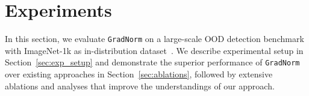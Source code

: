 \documentclass{article}
\begin{document}


\vspace{-0.3cm}

\section{Experiments}
\label{sec:experiments}
\vspace{-0.3cm}
In this section, we evaluate \texttt{GradNorm} on a large-scale OOD detection benchmark with ImageNet-1k as in-distribution dataset~\cite{huang2021mos}. We describe experimental setup in Section~\ref{sec:exp_setup} and demonstrate the superior performance of \texttt{GradNorm} over existing approaches in Section~\ref{sec:ablations}, followed by extensive ablations and analyses that improve the understandings of our approach. %

\vspace{-0.2cm}
\end{document}
